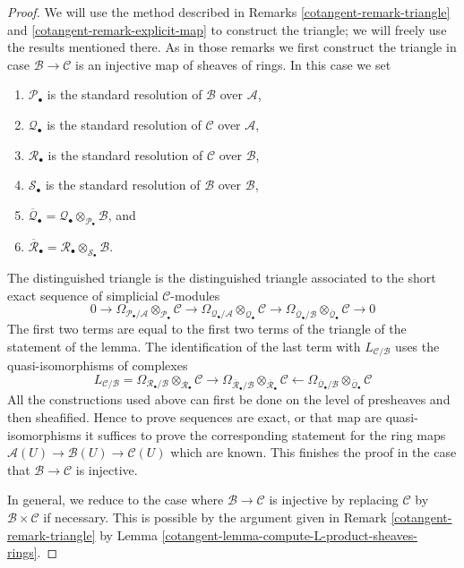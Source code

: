 \begin{proof}

We will use the method described in
Remarks \ref{cotangent-remark-triangle} and \ref{cotangent-remark-explicit-map}
to construct the triangle; we will freely use the results mentioned there.
As in those remarks we first construct the triangle in case
$\mathcal{B} \to \mathcal{C}$ is an injective map of sheaves of rings.
In this case we set
\begin{enumerate}
\item $\mathcal{P}_\bullet$ is the standard resolution of $\mathcal{B}$
over $\mathcal{A}$,
\item $\mathcal{Q}_\bullet$ is the standard resolution of $\mathcal{C}$
over $\mathcal{A}$,
\item $\mathcal{R}_\bullet$ is the standard resolution of $\mathcal{C}$
over $\mathcal{B}$,
\item $\mathcal{S}_\bullet$ is the standard resolution of $\mathcal{B}$
over $\mathcal{B}$,
\item $\overline{\mathcal{Q}}_\bullet =
\mathcal{Q}_\bullet \otimes_{\mathcal{P}_\bullet} \mathcal{B}$, and
\item $\overline{\mathcal{R}}_\bullet =
\mathcal{R}_\bullet \otimes_{\mathcal{S}_\bullet} \mathcal{B}$.
\end{enumerate}
The distinguished triangle is the distinguished triangle associated
to the short exact sequence
of simplicial $\mathcal{C}$-modules
$$
0 \to
\Omega_{\mathcal{P}_\bullet/\mathcal{A}}
\otimes_{\mathcal{P}_\bullet} \mathcal{C} \to
\Omega_{\mathcal{Q}_\bullet/\mathcal{A}}
\otimes_{\mathcal{Q}_\bullet} \mathcal{C} \to
\Omega_{\overline{\mathcal{Q}}_\bullet/\mathcal{B}}
\otimes_{\overline{\mathcal{Q}}_\bullet} \mathcal{C} \to 0
$$
The first two terms are equal to the first two terms of the triangle
of the statement of the lemma. The identification of the last term with
$L_{\mathcal{C}/\mathcal{B}}$ uses the quasi-isomorphisms of complexes
$$
L_{\mathcal{C}/\mathcal{B}} =
\Omega_{\mathcal{R}_\bullet/\mathcal{B}}
\otimes_{\mathcal{R}_\bullet} \mathcal{C}
\longrightarrow
\Omega_{\overline{\mathcal{R}}_\bullet/\mathcal{B}}
\otimes_{\overline{\mathcal{R}}_\bullet} \mathcal{C}
\longleftarrow
\Omega_{\overline{\mathcal{Q}}_\bullet/\mathcal{B}}
\otimes_{\overline{\mathcal{Q}}_\bullet} \mathcal{C}
$$
All the constructions used above can first be done on the level
of presheaves and then sheafified. Hence to prove sequences are exact,
or that map are quasi-isomorphisms it suffices to prove the corresponding
statement for the ring maps
$\mathcal{A}(U) \to \mathcal{B}(U) \to \mathcal{C}(U)$
which are known. This finishes the proof in the case that
$\mathcal{B} \to \mathcal{C}$ is injective.

\medskip\noindent
In general, we reduce to the case where $\mathcal{B} \to \mathcal{C}$ is
injective by replacing $\mathcal{C}$ by $\mathcal{B} \times \mathcal{C}$ if
necessary. This is possible by the argument given in
Remark \ref{cotangent-remark-triangle} by
Lemma \ref{cotangent-lemma-compute-L-product-sheaves-rings}.
\end{proof}

